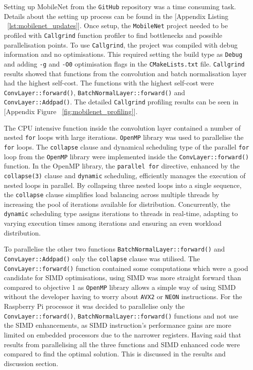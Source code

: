 Setting up MobileNet from the \texttt{GitHub} repository\cite{mobilenet_repo} was a time consuming task. Details about the setting up process can be found in the [Appendix Listing ~\ref{lst:mobilenet_updates}]. Once setup, the \texttt{MobileNet} project needed to be profiled with \texttt{Callgrind} function profiler to find bottlenecks and possible parallelisation points. To use \texttt{Callgrind}, the project was compiled with debug information and no optimisations. This required setting the build type as \texttt{Debug} and adding \texttt{-g} and \texttt{-O0} optimisation flags in the \texttt{CMakeLists.txt} file. \texttt{Callgrind} results showed that functions from the convolution and batch normalisation layer had the highest self-cost. The functions with the highest self-cost were \texttt{ConvLayer::forward()}, \texttt{BatchNormalLayer::forward()} and \texttt{ConvLayer::Addpad()}. The detailed \texttt{Callgrind} profiling results can be seen in [Appendix Figure ~\ref{fig:mobilenet_profiling}]. 

The CPU intensive function inside the convolution layer contained a number of nested \texttt{for} loops with large iterations. \texttt{OpenMP} library was used to parallelise the \texttt{for} loops. The \texttt{collapse} clause and dynamical scheduling type of the parallel \texttt{for} loop from the \texttt{OpenMP} library were implemented inside the \texttt{ConvLayer::forward()} function. In the OpenMP library, the \texttt{parallel for} directive, enhanced by the \texttt{collapse(3)} clause and \texttt{dynamic} scheduling, efficiently manages the execution of nested loops in parallel. By collapsing three nested loops into a single sequence, the \texttt{collapse} clause simplifies load balancing across multiple threads by increasing the pool of iterations available for distribution. Concurrently, the \texttt{dynamic} scheduling type assigns iterations to threads in real-time, adapting to varying execution times among iterations and ensuring an even workload distribution\cite{openmp_guide}. 

To parallelise the other two functions \texttt{BatchNormalLayer::forward()} and \texttt{ConvLayer::Addpad()} only the \texttt{collapse} clause was utilised. The \texttt{ConvLayer::forward()} function contained some computations which were a good candidate for SIMD optimisations, using SIMD was more straight forward than compared to objective 1 as \texttt{OpenMP} library allows a simple way of using SIMD without the developer having to worry about \texttt{AVX2} or \texttt{NEON} instructions. For the Raspberry Pi processor it was decided to parallelise only the \texttt{ConvLayer::forward()}, \texttt{BatchNormalLayer::forward()} functions and not use the SIMD enhancements, as SIMD instruction's performance gains are more limited on embedded processors due to the narrower registers\cite{embedded_processors_reduced_simd_performance}. Having said that results from parallelising all the three functions and SIMD enhanced code were compared to find the optimal solution. This is discussed in the results and discussion section. 

